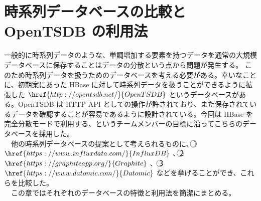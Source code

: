 \documentclass{scrartcl}
\begin{document}
\section{時系列データベースの比較と OpenTSDB の利用法}
\label{sec:org83dfa88}
一般的に時系列データのような、単調増加する要素を持つデータを通常の大規模データベースに保存することはデータの分散という点から問題が発生する。 \cite{hbase-reference} このため時系列データを扱うためのデータベースを考える必要がある。幸いなことに、初期案にあった HBase に対して時系列データを扱うことができるように拡張した \(\href{http://opentsdb.net/}{OpenTSDB}\) というデータベースがある。OpenTSDB は HTTP API としての操作が許されており、また保存されているデータを確認することが容易であるように設計されている。今回は HBase を完全分散モードで利用する、というチームメンバーの目標に沿ってこちらのデータベースを採用した。\\
　他の時系列データベースの提案として考えられるものに、\textcircled{\scriptsize 1} \(\href{https://www.influxdata.com/}{InfluxDB}\) 、\textcircled{\scriptsize 2} \(\href{https://graphiteapp.org/}{Graphite}\) 、 \textcircled{\scriptsize 3} \(\href{https://www.datomic.com/}{Datomic}\) などを挙げることができ、これらを比較した。\\
　この章ではそれぞれのデータベースの特徴と利用法を簡潔にまとめる。\\
\end{document}

